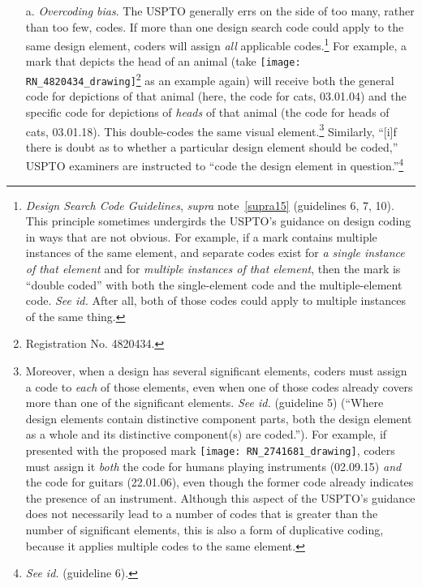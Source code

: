 \documentclass[letterpaper, 11pt, oneside]{article}
\begin{document}
\begin{enumerate}

\item[a.] \textit{Overcoding bias}. The USPTO generally errs on the side of too many, rather than too few, codes. If more than one design search code could apply to the same design element, coders will assign \emph{all} applicable codes.\footnote{\label{supra25} \textit{Design Search Code Guidelines}, \textit{supra} note~\ref{supra15} (guidelines 6, 7, 10). This principle sometimes undergirds the USPTO's guidance on design coding in ways that are not obvious. For example, if a mark contains multiple instances of the same element, and separate codes exist for \emph{a single instance of that element} and for \emph{multiple instances of that element}, then the mark is ``double coded'' with both the single-element code and the multiple-element code. \textit{See id.} After all, both of those codes could apply to multiple instances of the same thing.} For example, a mark that depicts the head of an animal (take \texttt{[image: RN\_4820434\_drawing]}\footnote{Registration No. 4820434.} as an example again) will receive both the general code for depictions of that animal (here, the code for cats, 03.01.04) and the specific code for depictions of \emph{heads} of that animal (the code for heads of cats, 03.01.18). This double-codes the same visual element.\footnote{Moreover, when a design has several significant elements, coders must assign a code to \emph{each} of those elements, even when one of those codes already covers more than one of the significant elements. \textit{See id.} (guideline 5) (``Where design elements contain distinctive component parts, both the design element as a whole and its distinctive component(s) are coded.''). For example, if presented with the proposed mark \texttt{[image: RN\_2741681\_drawing]}, coders must assign it \emph{both} the code for humans playing instruments (02.09.15) \emph{and} the code for guitars (22.01.06), even though the former code already indicates the presence of an instrument. Although this aspect of the USPTO's guidance does not necessarily lead to a number of codes that is greater than the number of significant elements, this is also a form of duplicative coding, because it applies multiple codes to the same element.} Similarly, ``[i]f there is doubt as to whether a particular design element should be coded,'' USPTO examiners are instructed to ``code the design element in question.''\footnote{\textit{See id.} (guideline 6).}


\end{enumerate}
\end{document}
